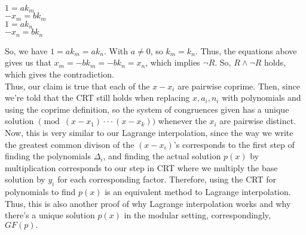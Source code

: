\documentclass{article}
\begin{document}
\begin{center}
$1 = ak_m$ \\
$-x_m = bk_m$ \\
$1 = ak_n$ \\
$-x_n = bk_n$
\end{center}
\indent So, we have $1 = ak_m = ak_n$. With $a\neq0$, so $k_m = k_n$. Thus, the equations above gives us that $x_m = -bk_m = -bk_n = x_n$, which implies $\neg R$. So, $R\land\neg R$ holds, which gives the contradiction. \\[.1cm]
\indent Thus, our claim is true that each of the $x-x_i$ are pairwise coprime. Then, since we're told that the CRT still holds when replacing $x, a_i, n_i$ with polynomials and using the coprime definition, so the system of congruences given has a unique solution $\pmod{(x-x_1)\cdot\cdot\cdot(x-x_k)}$ whenever the $x_i$ are pairwise distinct. \\[.3cm]
\indent Now, this is very similar to our Lagrange interpolation, since the way we write the greatest common divison of the $(x-x_i)$'s corresponds to the first step of finding the polynomials $
\Delta_i$, and finding the actual solution $p(x)$ by multiplication corresponds to our step in CRT where we multiply the base solution by $y_i$ for each corresponding factor. Therefore, using the CRT for polynomials to find $p(x)$ is an equivalent method to Lagrange interpolation. Thus, this is also another proof of why Lagrange interpolation works and why there's a unique solution $p(x)$ in the modular setting, correspondingly, $GF(p).$
\end{document}
